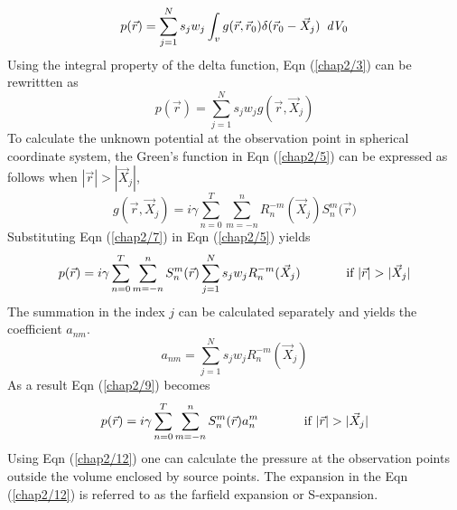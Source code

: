\begin{equation}
\label{chap2/3}
 p(\vec{r}) = \sum_{j=1}^{N}{s_j w_j}\int_{v} g(\vec{r},\vec{r}_0)\delta(\vec{r}_0-\vec{X}_j)  \enskip  \textit{dV}_0
\end{equation}
Using the integral  property of the  delta function, Eqn (\ref{chap2/3}) can be
rewrittten as 
 \begin{equation}
\label{chap2/5}
p(\vec{r}) = \sum_{j=1}^{N}{ s_j w_j g(\vec{r},\vec{X}_j)}
\end{equation}
To calculate the unknown potential at the observation point in spherical coordinate system, the  Green's function  in  Eqn (\ref{chap2/5}) can be expressed as follows when   $|\vec{r}|>|\vec{X}_j|$, 
\begin{equation}
\label{chap2/7}
g(\vec{r},\vec{X}_j) = i\gamma\sum_{n=0}^{T}\sum_{m=-n}^{n}R_n^{-m}(\vec{X}_j)S_n^{m}({\vec{r})} 
\end{equation}
Substituting Eqn (\ref{chap2/7}) in Eqn (\ref{chap2/5}) yields
\begin{equation}
\label{chap2/9}
p(\vec{r}) =  i\gamma\sum_{n=0}^{T}\sum_{m=-n}^{n}
S_{n}^{m}(\vec{r})
\sum_{j=1}^{N}{ s_j w_j R_n^{-m}(\vec{X}_j)}\hspace{0.5 in}\text{if $ |\vec{r}|>|\vec{X}_{j}|$}
\end{equation}
The summation in the index $j$ can be calculated separately and yields the coefficient $a_{nm}$. 
\begin{equation}
\label{chap2/11}
a_{nm}=\sum_{j=1}^{N}{ s_j w_j R_n^{-m}(\vec{X}_j)}
\end{equation}
As a result Eqn (\ref{chap2/9}) becomes 
\begin{equation}
\label{chap2/12}
p(\vec{r}) =  i\gamma\sum_{n=0}^{T}\sum_{m=-n}^{n}S_{n}^{m}(\vec{r}) a_n^{m} \hspace{0.5 in}\text{if $ |\vec{r}|>|\vec{X}_{j}|$}
\end{equation} 
Using Eqn (\ref{chap2/12}) one can calculate 
the pressure at the observation points outside the volume enclosed 
by source points. The expansion in the  Eqn (\ref{chap2/12}) is referred to as the 
farfield expansion or S-expansion.

\newpage
